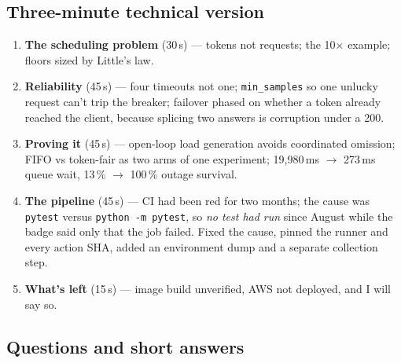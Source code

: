 \documentclass[10pt,a4paper]{article}
\begin{document}
\subsection{Three-minute technical version}

\begin{enumerate}
\item \textbf{The scheduling problem} (30\,s) — tokens not requests; the 10×
  example; floors sized by Little's law.
\item \textbf{Reliability} (45\,s) — four timeouts not one; \texttt{min\_samples}
  so one unlucky request can't trip the breaker; failover phased on whether a
  token already reached the client, because splicing two answers is corruption
  under a 200.
\item \textbf{Proving it} (45\,s) — open-loop load generation avoids
  coordinated omission; FIFO vs token-fair as two arms of one experiment;
  19{,}980\,ms $\rightarrow$ 273\,ms queue wait, 13\,\% $\rightarrow$ 100\,\%
  outage survival.
\item \textbf{The pipeline} (45\,s) — CI had been red for two months; the cause
  was \texttt{pytest} versus \texttt{python -m pytest}, so \emph{no test had
  run} since August while the badge said only that the job failed. Fixed the
  cause, pinned the runner and every action SHA, added an environment dump and
  a separate collection step.
\item \textbf{What's left} (15\,s) — image build unverified, AWS not deployed,
  and I will say so.
\end{enumerate}

\subsection{Questions and short answers}
\end{document}
